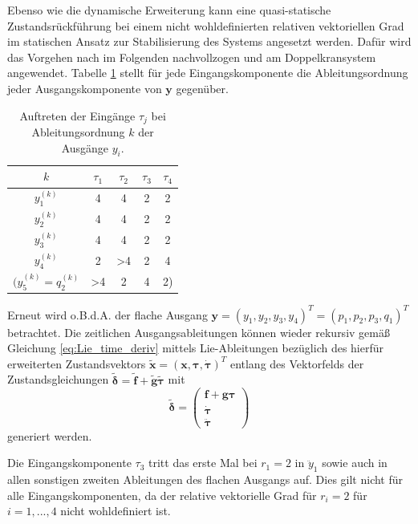 Ebenso wie die dynamische Erweiterung kann eine quasi-statische Zustandsrückführung bei einem nicht wohldefinierten relativen vektoriellen Grad im statischen Ansatz zur Stabilisierung des Systems angesetzt werden. Dafür wird das Vorgehen nach \cite[S. 206]{NLRT_Roebenack} im Folgenden nachvollzogen und am Doppelkransystem angewendet. Tabelle \ref{tab:input_occurence} stellt für jede Eingangskomponente die Ableitungsordnung jeder Ausgangskomponente von $\mathbf{y}$ gegenüber.

\begin{table}[htbp]%
	\centering
	\caption{Auftreten der Eingänge $\tau_j$ bei Ableitungsordnung $k$ der Ausgänge $y_i$.}
	\label{tab:input_occurence}
	\begin{tabular}{ c| c c c c } 
		\toprule
		$k$ & $\tau_1$ & $\tau_2$ & $\tau_3$ & $\tau_4$ \\ 
		\hline
		$y_1^{(k)}$ & 4 & 4 & 2 & 2\\ 
		$y_2^{(k)}$ & 4 & 4 & 2 & 2\\
		$y_3^{(k)}$ & 4 & 4 & 2 & 2\\		
		$y_4^{(k)}$ & 2 & >4 & 2 & 4\\
		$(y_5^{(k)} = q_2^{(k)}$ & >4 & 2 & 4 & 2)\\
		\bottomrule
	\end{tabular}
\end{table}

Erneut wird o.B.d.A. der flache Ausgang ${\mathbf{y} = (y_1, y_2, y_3, y_4)^T = (p_1, p_2, p_3, q_1)^T}$ betrachtet. Die zeitlichen Ausgangsableitungen können wieder rekursiv gemäß Gleichung \eqref{eq:Lie_time_deriv} mittels Lie-Ableitungen bezüglich des hierfür erweiterten Zustandsvektors $\tilde{\mathbf{x}} = (\mathbf{x}, \boldsymbol{\tau}, \dot{\boldsymbol{\tau}})^T$ entlang des Vektorfelds der Zustandsgleichungen $\tilde{\boldsymbol{\delta}} = \tilde{\mathbf{f}} + \tilde{\mathbf{g}} \tilde{\boldsymbol{\tau}}$ mit
\begin{equation}
\tilde{\boldsymbol{\delta}} =
\left(\begin{matrix}
\mathbf{f} + \mathbf{g} \boldsymbol{\tau}\\
\dot{\boldsymbol{\tau}} \\
\ddot{\boldsymbol{\tau}}
\end{matrix}\right)
\end{equation}
generiert werden.

Die Eingangskomponente $\tau_3$ tritt das erste Mal bei $r_1 = 2$ in $\ddot{y}_1$ sowie auch in allen sonstigen zweiten Ableitungen des flachen Ausgangs auf. Dies gilt nicht für alle Eingangskomponenten, da der relative vektorielle Grad für $r_i = 2$ für $i = 1, ..., 4$ nicht wohldefiniert ist.

